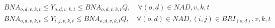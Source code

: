 \begin{align}
	 & BNA_{o,d,v,k,t} \leq Y_{o,d,v,k,t} \leq BNA_{o,d,v,k,t} Q, \quad  \forall (o,d)\in NAD, v, k, t                                                                                                                \label{eq: m1_activ_bin_autho}             \\
	 & BNA_{o,d,v,k,t} \leq Y_{i,j,v,k,t} \leq BNA_{o,d,v,k,t} Q, \quad  \forall (o,d)\in NAD, (i,j) \in BRI_{(o,d)}, v,k,t                                                                                           \label{eq: m1_autho_igualar_trecho_maior}  \\

\end{align}
